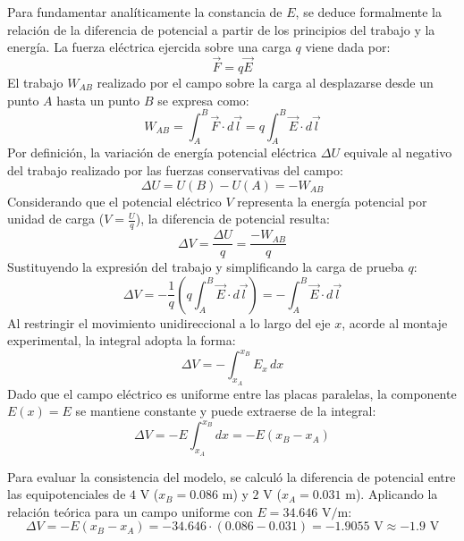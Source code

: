 \documentclass[12pt]{article}
\begin{document}
Para fundamentar analíticamente la constancia de $E$, se deduce formalmente la relación de la diferencia de potencial a partir de los principios del trabajo y la energía. La fuerza eléctrica ejercida sobre una carga $q$ viene dada por:
\begin{equation}
    \overrightarrow{F} = q\overrightarrow{E}
\end{equation}
El trabajo $W_{AB}$ realizado por el campo sobre la carga al desplazarse desde un punto $A$ hasta un punto $B$ se expresa como:
\begin{equation}
    W_{AB} = \int_{A}^{B} \overrightarrow{F} \cdot d\overrightarrow{l} = q \int_{A}^{B} \overrightarrow{E} \cdot d\overrightarrow{l}
\end{equation}
Por definición, la variación de energía potencial eléctrica $\Delta U$ equivale al negativo del trabajo realizado por las fuerzas conservativas del campo:
\begin{equation}
    \Delta U = U(B) - U(A) = -W_{AB}
\end{equation}
Considerando que el potencial eléctrico $V$ representa la energía potencial por unidad de carga ($V = \frac{U}{q}$), la diferencia de potencial resulta:
\begin{equation}
    \Delta V = \frac{\Delta U}{q} = \frac{-W_{AB}}{q}
\end{equation}
Sustituyendo la expresión del trabajo y simplificando la carga de prueba $q$:
\begin{equation}
    \Delta V = -\frac{1}{q} \left( q \int_{A}^{B} \overrightarrow{E} \cdot d\overrightarrow{l} \right) = -\int_{A}^{B} \overrightarrow{E} \cdot d\overrightarrow{l}
\end{equation}
Al restringir el movimiento unidireccional a lo largo del eje $x$, acorde al montaje experimental, la integral adopta la forma:
\begin{equation}
    \Delta V = -\int_{x_A}^{x_B} E_x \, dx
\end{equation}
Dado que el campo eléctrico es uniforme entre las placas paralelas, la componente $E(x) = E$ se mantiene constante y puede extraerse de la integral:
\begin{equation}
    \Delta V = -E \int_{x_A}^{x_B} dx = -E(x_B - x_A)
\end{equation}

Para evaluar la consistencia del modelo, se calculó la diferencia de potencial entre las equipotenciales de $4\text{ V}$ ($x_B = 0.086\text{ m}$) y $2\text{ V}$ ($x_A = 0.031\text{ m}$). Aplicando la relación teórica para un campo uniforme con $E = 34.646\text{ V/m}$:
\begin{equation}
    \Delta V = -E(x_B - x_A) = -34.646 \cdot (0.086 - 0.031) = -1.9055\text{ V} \approx -1.9\text{ V}
\end{equation}
\end{document}
